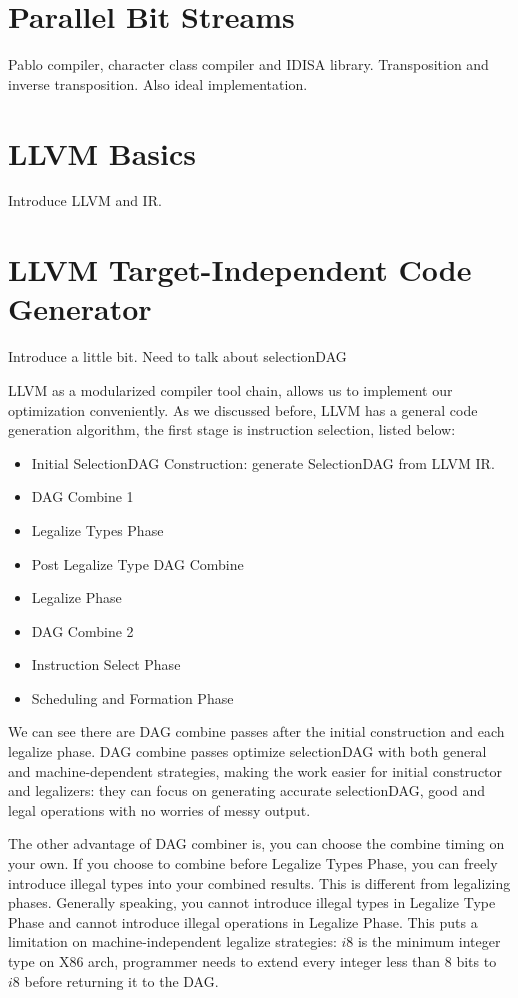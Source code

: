 \section{Parallel Bit Streams}
Pablo compiler, character class compiler and IDISA library. Transposition and inverse transposition. Also ideal implementation.

\section{LLVM Basics}
Introduce LLVM and IR.

\section{LLVM Target-Independent Code Generator}
Introduce a little bit.
Need to talk about selectionDAG

LLVM as a modularized compiler tool chain, allows us to implement our optimization conveniently. As we discussed before, LLVM has a general code generation algorithm, the first stage is instruction selection, listed below\cite{llvm_code_gen}:

\begin{itemize}
  \item Initial SelectionDAG Construction: generate SelectionDAG from LLVM IR.
  \item DAG Combine 1
  \item Legalize Types Phase
  \item Post Legalize Type DAG Combine
  \item Legalize Phase
  \item DAG Combine 2
  \item Instruction Select Phase
  \item Scheduling and Formation Phase
\end{itemize}

We can see there are DAG combine passes after the initial construction and each legalize phase\cite{llvm_code_gen}. DAG combine passes optimize selectionDAG with both general and machine-dependent strategies, making the work easier for initial constructor and legalizers: they can focus on generating accurate selectionDAG, good and legal operations with no worries of messy output.

The other advantage of DAG combiner is, you can choose the combine timing on your own. If you choose to combine before Legalize Types Phase, you can freely introduce illegal types into your combined results. This is different from legalizing phases. Generally speaking, you cannot introduce illegal types in Legalize Type Phase and cannot introduce illegal operations in Legalize Phase. This puts a limitation on machine-independent legalize strategies: $i8$ is the minimum integer type on X86 arch, programmer needs to extend every integer less than 8 bits to $i8$ before returning it to the DAG.

